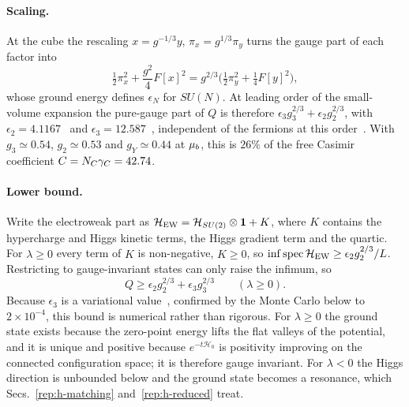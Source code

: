\paragraph{Scaling.}
At the cube the rescaling $x=g^{-1/3}y$, $\pi_x=g^{1/3}\pi_y$ turns the gauge part of each factor into
\begin{equation}
\tfrac12\pi_x^2+\frac{g^2}{4}F[x]^2=g^{2/3}\Big(\tfrac12\pi_y^2+\tfrac14F[y]^2\Big),
\end{equation}
whose ground energy defines $\epsilon_N$ for $SU(N)$.
At leading order of the small-volume expansion the pure-gauge part of $Q$ is therefore $\epsilon_3g_3^{2/3}+\epsilon_2g_2^{2/3}$, with $\epsilon_2=4.1167$~\cite{Luscher:1983gm} and $\epsilon_3=12.587$~\cite{Weisz:1986vu,Pavel:2021mxn}, independent of the fermions at this order~\cite{vanBaal:1988va}. %
With $g_3\simeq0.54$, $g_2\simeq0.53$ and $g_Y\simeq0.44$ at $\mu_b$, this is $26\%$ of the free Casimir coefficient $C=N_C\gamma_C=42.74$. %

\paragraph{Lower bound.}
Write the electroweak part as $\mathcal H_{\rm EW}=\mathcal H_{SU(2)}\otimes\mathbf{1}+K$, where $K$ contains the hypercharge and Higgs kinetic terms, the Higgs gradient term and the quartic.
For $\lambda\geq0$ every term of $K$ is non-negative, $K\geq0$, so ${\rm inf\,spec}\,\mathcal H_{\rm EW}\geq\epsilon_2g_2^{2/3}/L$.
Restricting to gauge-invariant states can only raise the infimum, so
\begin{equation}
Q\geq\epsilon_2g_2^{2/3}+\epsilon_3g_3^{2/3}\qquad(\lambda\geq0).
\end{equation}
Because $\epsilon_3$ is a variational value~\cite{Weisz:1986vu,Pavel:2021mxn}, confirmed by the Monte Carlo below to $2\times10^{-4}$, this bound is numerical rather than rigorous. %
For $\lambda\geq0$ the ground state exists because the zero-point energy lifts the flat valleys of the potential, and it is unique and positive because $e^{-t\mathcal H_0}$ is positivity improving on the connected configuration space; it is therefore gauge invariant.
For $\lambda<0$ the Higgs direction is unbounded below and the ground state becomes a resonance, which Secs.~\ref{rep:h-matching} and~\ref{rep:h-reduced} treat.

